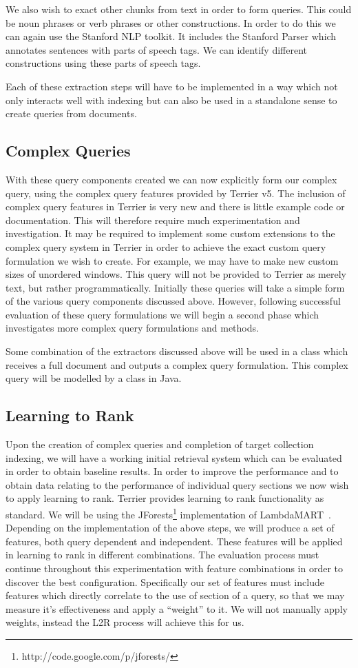 \documentclass{mprop}
\let\oldcite=\cite
\renewcommand\cite[1]{\ifthenelse{\equal{#1}{NEEDED}}{\ensuremath{^\texttt{[citation~needed]}}}{\oldcite{#1}}}
\begin{document}
We also wish to exact other chunks from text in order to form queries.
This could be noun phrases or verb phrases or other constructions.
In order to do this we can again use the Stanford NLP toolkit.
It includes the Stanford Parser which annotates sentences with parts of speech tags.
We can identify different constructions using these parts of speech tags.

Each of these extraction steps will have to be implemented in a way which not only interacts well with indexing but can also be used in a standalone sense to create queries from documents.


\subsection{Complex Queries}
With these query components created we can now explicitly form our complex query, using the complex query features provided by Terrier v5. 
The inclusion of complex query features in Terrier is very new and there is little example code or documentation.
This will therefore require much experimentation and investigation.
It may be required to implement some  custom extensions to the complex query system in Terrier in order to achieve the exact custom query formulation we wish to create.
For example, we may have to make new custom sizes of unordered windows. 
This query will not be provided to Terrier as merely text, but rather programmatically. 
Initially these queries will take a simple form of the various query components discussed above.
However, following successful evaluation of these query formulations we will begin a second phase which investigates more complex query formulations and methods.

Some combination of the extractors discussed above will be used in a class which receives a full document and outputs a complex query formulation.
This complex query will be modelled by a class in Java.

\subsection{Learning to Rank}
Upon the creation of complex queries and completion of target collection indexing, we will have a working initial retrieval system which can be evaluated in order to obtain baseline results.
In order to improve the performance and to obtain data relating to the performance of individual query sections we now wish to apply learning to rank.
Terrier provides learning to rank functionality as standard.
We will be using the JForests\footnote{http://code.google.com/p/jforests/} implementation of LambdaMART~\cite{wu2008ranking}.
Depending on the implementation of the above steps, we will produce a set of features, both query dependent and independent.
These features will be applied in learning to rank in different combinations.
The evaluation process must continue throughout this experimentation with feature combinations in order to discover the best configuration.
Specifically our set of features must include features which directly correlate to the use of section of a query, so that we may measure it's effectiveness and apply a ``weight'' to it.
We will not manually apply weights, instead the L2R process will achieve this for us.
\end{document}
